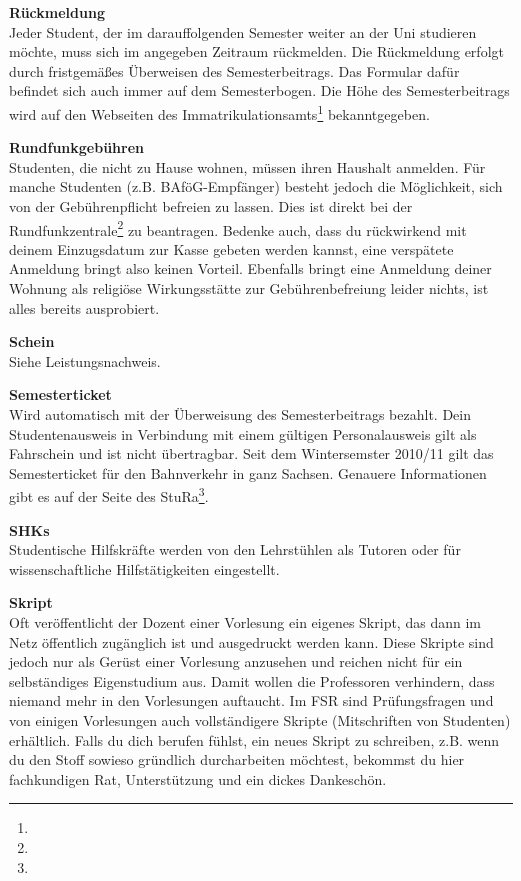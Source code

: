 \textbf{Rückmeldung} \\
Jeder Student, der im darauffolgenden Semester weiter an der Uni studieren möchte, muss sich im angegeben Zeitraum rückmelden.
Die Rückmeldung erfolgt durch fristgemäßes Überweisen des Semesterbeitrags.
Das Formular dafür befindet sich auch immer auf dem Semesterbogen.
Die Höhe des Semesterbeitrags wird auf den Webseiten des Immatrikulationsamts\footnote{} bekanntgegeben.

\textbf{Rundfunkgebühren} \\
Studenten, die nicht zu Hause wohnen, müssen ihren Haushalt anmelden.
Für manche Studenten (z.B. BAföG-Empfänger) besteht jedoch die Möglichkeit, sich von der Gebührenpflicht befreien zu lassen.
Dies ist direkt bei der Rundfunkzentrale\footnote{} zu beantragen.
Bedenke auch, dass du rückwirkend mit deinem Einzugsdatum zur Kasse gebeten werden kannst, eine verspätete Anmeldung bringt also keinen Vorteil.
Ebenfalls bringt eine Anmeldung deiner Wohnung als religiöse Wirkungsstätte zur Gebührenbefreiung leider nichts, ist alles bereits ausprobiert.

\textbf{Schein} \\
Siehe Leistungsnachweis.

\textbf{Semesterticket} \\
Wird automatisch mit der Überweisung des Semesterbeitrags bezahlt.
Dein Studentenausweis in Verbindung mit einem gültigen Personalausweis gilt als Fahrschein und ist nicht übertragbar.
Seit dem Wintersemster 2010/11 gilt das Semesterticket für den Bahnverkehr in ganz Sachsen.
Genauere Informationen gibt es auf der Seite des StuRa\footnote{}.


\textbf{SHKs} \\
Studentische Hilfskräfte werden von den Lehrstühlen als Tutoren oder für wissenschaftliche Hilfstätigkeiten eingestellt.

\textbf{Skript} \\
Oft veröffentlicht der Dozent einer Vorlesung ein eigenes Skript, das dann im Netz öffentlich zugänglich ist und ausgedruckt werden kann.
Diese Skripte sind jedoch nur als Gerüst einer Vorlesung anzusehen und reichen nicht für ein selbständiges Eigenstudium aus.
Damit wollen die Professoren verhindern, dass niemand mehr in den Vorlesungen auftaucht.
Im FSR sind Prüfungsfragen und von einigen Vorlesungen auch vollständigere Skripte (Mitschriften von Studenten) erhältlich.
Falls du dich berufen fühlst, ein neues Skript zu schreiben, z.B. wenn du den Stoff sowieso gründlich durcharbeiten möchtest, bekommst du hier fachkundigen Rat, Unterstützung und ein dickes Dankeschön.

